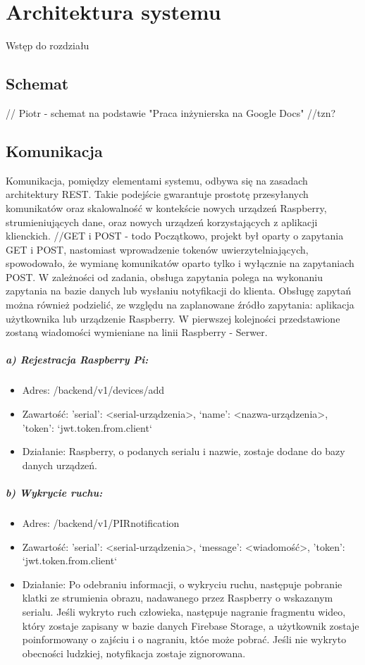 \chapter{Architektura systemu}

Wstęp do rozdziału

\section*{Schemat}

// Piotr - schemat na podstawie "Praca inżynierska na Google Docs"
//tzn?

\section*{Komunikacja}

Komunikacja, pomiędzy elementami systemu, odbywa się na zasadach architektury REST. Takie podejście gwarantuje prostotę przesyłanych komunikatów oraz skalowalność w kontekście nowych urządzeń Raspberry, strumieniujących dane, oraz nowych urządzeń korzystających z aplikacji klienckich. 
//GET i POST - todo
Początkowo, projekt był oparty o zapytania GET i POST, nastomiast wprowadzenie tokenów uwierzytelniających, spowodowało, że wymianę komunikatów oparto tylko i wyłącznie na zapytaniach POST. 
W zależności od zadania, obsługa zapytania polega na wykonaniu zapytania na bazie danych lub wysłaniu notyfikacji do klienta.
Obsługę zapytań można również podzielić, ze względu na zaplanowane źródło zapytania: aplikacja użytkownika lub urządzenie Raspberry.
W pierwszej kolejności przedstawione zostaną wiadomości wymieniane na linii Raspberry - Serwer.
\paragraph{a) Rejestracja Raspberry Pi:}
\begin{itemize}
\item Adres: /backend/v1/devices/add
\item Zawartość: {'serial': <serial-urządzenia>, ‘name’: <nazwa-urządzenia>, 'token': `jwt.token.from.client`}
\item Działanie: Raspberry, o podanych serialu i nazwie, zostaje dodane do bazy danych urządzeń.
\end{itemize}
\paragraph{b) Wykrycie ruchu:}
\begin{itemize}
\item Adres: /backend/v1/PIRnotification
\item Zawartość: {'serial': <serial-urządzenia>, ‘message’: <wiadomość>, 'token': `jwt.token.from.client`}
\item Działanie: Po odebraniu informacji, o wykryciu ruchu, następuje pobranie klatki ze strumienia obrazu, nadawanego przez Raspberry o wskazanym serialu. Jeśli wykryto ruch człowieka, następuje nagranie fragmentu wideo, który zostaje zapisany w bazie danych Firebase Storage, a użytkownik zostaje poinformowany o zajściu i o nagraniu, któe może pobrać. Jeśli nie wykryto obecności ludzkiej, notyfikacja zostaje zignorowana.
\end{itemize}
